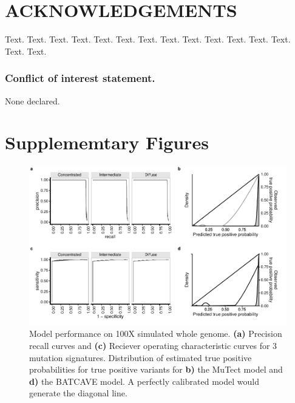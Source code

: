 \documentclass[a4,center,fleqn]{NAR}
\newcommand{\batcave}{BATCAVE }
\newcommand{\beginsupplement}{%
        \clearpage
        \onecolumn
        \setcounter{table}{0}
        \renewcommand{\thetable}{S\arabic{table}}%
        \setcounter{figure}{0}
        \renewcommand{\thefigure}{S\arabic{figure}}%
     }
\begin{document}
\section{ACKNOWLEDGEMENTS}

Text. Text. Text. Text. Text. Text. Text. Text. Text. Text. Text.
Text. Text. Text. Text.


\subsubsection{Conflict of interest statement.} None declared.



\beginsupplement
\section{Supplememtary Figures}

\begin{figure}[b]
  \begin{center}
  \includegraphics{figures/fig_wgs.pdf}
  \end{center}
  \caption{Model performance on 100X simulated whole genome.
  \textbf{(a)} Precision recall curves and \textbf{(c)} Reciever operating characteristic curves for 3 mutation signatures.
  Distribution of estimated true positive probabilities for true positive  variants for \textbf{b)} the MuTect model and \textbf{d)} the \batcave model.
  A perfectly calibrated model would generate the diagonal line.}
\label{NAR-wgs_fig}
\end{figure}
\end{document}
